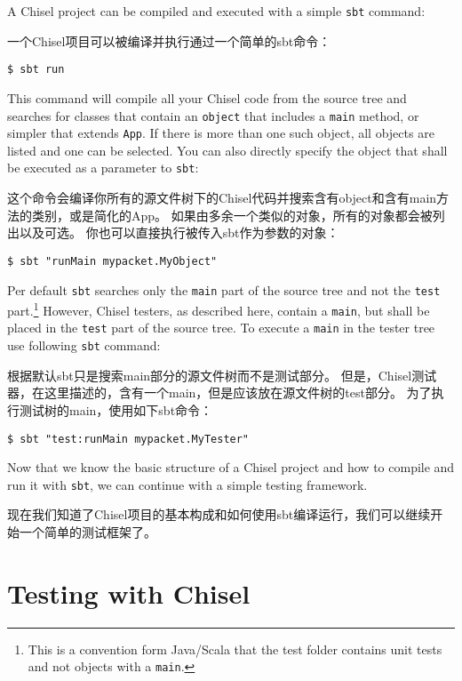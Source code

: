 \documentclass[%
    10pt,
    headinclude, footexclude,
    openright, %
    notitlepage,
    cleardoubleempty,
    headsepline,
    pointlessnumbers,
    bibtotoc, idxtotoc,
    ]{scrbook}
\newcommand{\code}[1]{{\small{\texttt{#1}}}}
\newcommand{\codefoot}[1]{{\footnotesize{\texttt{#1}}}}
\begin{document}
A Chisel project can be compiled and executed with a simple \code{sbt} command:

一个Chisel项目可以被编译并执行通过一个简单的sbt命令：

\begin{verbatim}
$ sbt run
\end{verbatim}

This command will compile all your Chisel code from the source tree and searches
for classes that contain an \code{object} that includes a \code{main} method, or simpler
that extends \code{App}. If there is more than one such object, all objects are listed and
one can be selected.
You can also directly specify the object that shall be executed as a parameter to \code{sbt}:

这个命令会编译你所有的源文件树下的Chisel代码并搜索含有object和含有main方法的类别，或是简化的App。
如果由多余一个类似的对象，所有的对象都会被列出以及可选。
你也可以直接执行被传入sbt作为参数的对象：


\begin{verbatim}
$ sbt "runMain mypacket.MyObject"
\end{verbatim}

Per default \code{sbt} searches only the \code{main} part of the source tree and not
the \code{test} part.\footnote{This is a convention form Java/Scala that the test folder contains
unit tests and not objects with a \codefoot{main}.} However, Chisel testers, as described here,
contain a \code{main}, but shall be placed in the \code{test} part of the source tree.
To execute a \code{main} in the tester tree use following \code{sbt} command:

根据默认sbt只是搜索main部分的源文件树而不是测试部分。
但是，Chisel测试器，在这里描述的，含有一个main，但是应该放在源文件树的test部分。
为了执行测试树的main，使用如下sbt命令：

\begin{verbatim}
$ sbt "test:runMain mypacket.MyTester"
\end{verbatim}

Now that we know the basic structure of a Chisel project and how to compile and run it
with \code{sbt}, we can continue with a simple testing framework.

现在我们知道了Chisel项目的基本构成和如何使用sbt编译运行，我们可以继续开始一个简单的测试框架了。
    
\section{Testing with Chisel}
\end{document}
